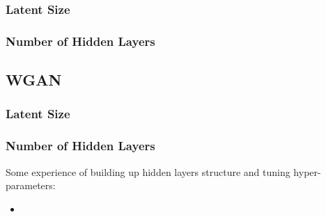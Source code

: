 \documentclass[12pt,letterpaper]{article}
\begin{document}
\subsubsection{Latent Size}

\subsubsection{Number of Hidden Layers}

\subsection{WGAN}

\subsubsection{Latent Size}

\subsubsection{Number of Hidden Layers}


Some experience of building up hidden layers structure and tuning hyper-parameters:
\begin{itemize}
    \item 
\end{itemize}







    
\end{document}
